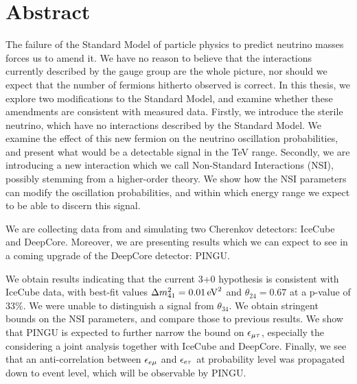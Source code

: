 \chapter*{Abstract}

The failure of the Standard Model of particle physics to predict neutrino masses forces us to amend it. We have no reason to believe that 
the interactions currently described by the gauge group are the whole picture, nor should we expect that the number of fermions hitherto observed is correct.
In this thesis, we explore two modifications to the Standard Model, and examine whether these amendments are consistent with measured data.
Firstly, we introduce the sterile neutrino, which have no interactions described by the Standard Model. We examine the effect of this 
new fermion on the neutrino oscillation probabilities, and present what would be a detectable signal in the \si{\TeV} range.
Secondly, we are introducing a new interaction which we call Non-Standard Interactions (NSI), possibly stemming from a higher-order theory. 
We show how the NSI parameters can modify the oscillation probabilities, and within which energy range we expect to be able to discern this signal.

We are collecting data from and simulating two Cherenkov detectors: IceCube and DeepCore. Moreover, we are presenting results which we 
can expect to see in a coming upgrade of the DeepCore detector: PINGU. 

We obtain results indicating that the current 3+0 hypothesis is consistent with IceCube data, with best-fit values $\dm[41] = \SI{0.01}{\eV^2}$ and $\theta_{24} = 0.67$ at 
a p-value of $33\%$. We were unable to distinguish a signal from $\theta_{34}$.
We obtain stringent bounds on the NSI parameters, and compare those to previous results. We show that PINGU is expected to further narrow the bound 
on $\epsilon_{\mu\tau}$, especially the considering a joint analysis together with IceCube and DeepCore. Finally, we see that an anti-correlation between 
$\epsilon_{e\mu}$ and $\epsilon_{e\tau}$ at probability level was propagated down to event level, which will be observable by PINGU.


